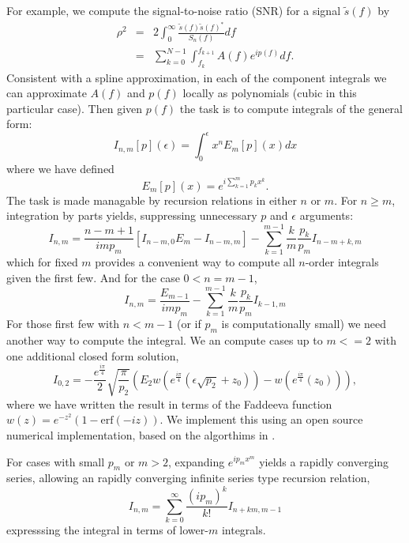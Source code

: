 \documentclass{revtex4}
\begin{document}
For example, we compute the signal-to-noise ratio (SNR) for a signal $\tilde s(f)$ by
\begin{eqnarray}
\rho^2&=&2\int_0^\infty\frac{\tilde s(f)\tilde s(f)^*}{S_n(f)}df\\
      &=&\sum_{k=0}^{N-1}\int_{f_k}^{f_{k+1}} A(f)e^{i p(f)}df.
\end{eqnarray}
Consistent with a spline approximation, in  each of the component integrals we can approximate $A(f)$ and $p(f)$ locally as polynomials (cubic in this particular case).  Then given $p(f)$ the  task is to compute integrals of the general form:
\begin{equation}
I_{n,m}[p](\epsilon)=\int_{0}^{\epsilon} x^nE_m[p](x)dx
\end{equation}
where we have defined
\begin{equation}
E_m[p](x)=e^{i\sum\limits_{k=1}^{m}p_kx^k}.
\end{equation}
The task is made managable by recursion relations in either $n$ or $m$.  For $n\geq m$, integration by parts yields, suppressing unnecessary $p$ and $\epsilon$ arguments:
\begin{equation}
I_{n,m}=\frac{n-m+1}{i m p_m}\left[I_{n-m,0}E_m-I_{n-m,m}\right]-\sum_{k=1}^{m-1}\frac{k}{m}\frac{p_k}{p_m}I_{n-m+k,m}
\end{equation}
which for fixed $m$ provides a convenient way to compute all $n$-order integrals given the first few.  And for the case $0<n=m-1$,
\begin{equation}
I_{n,m}=\frac{E_{m-1}}{i m p_m}-\sum_{k=1}^{m-1}\frac{k}{m}\frac{p_k}{p_m}I_{k-1,m}
\end{equation}
For those first few with $n<m-1$ (or if $p_m$ is computationally small)  we need another way to compute the integral.  We an compute cases up to $m<=2$ with one additional closed form solution,
\begin{equation}
I_{0,2}=-\frac{e^{\frac{i\pi}4}}2\sqrt{\frac{\pi}{p_2}}\left(E_2w\left(e^{\frac{i\pi}4}\left(\epsilon \sqrt{p_2}+z_0\right)\right)-w\left(e^{\frac{i\pi}4}\left(z_0\right)\right)\right),
\end{equation}
where we have written the result in terms of the Faddeeva function $w(z)=e^{-z^2}\left(1-{\mathrm{erf}}(-iz)\right)$.  We implement this using an open source numerical implementation\cite{FaddeevaPackage}, based on the algorthims in \cite{Poppe1990,Zaghloul2011}.

For cases with small $p_m$ or $m>2$, expanding $e^{ip_m x^m}$ yields a rapidly converging series, allowing an rapidly converging infinite series type recursion relation,
\begin{equation}
I_{n,m}=\sum_{k=0}^{\infty}\frac{(i p_m)^k}{k!}I_{n+km,m-1}
\end{equation}
expresssing the integral in terms of lower-$m$ integrals.
\end{document}
